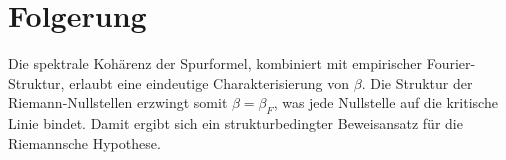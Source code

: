 \documentclass[12pt]{article}
\begin{document}
\section*{Folgerung}

Die spektrale Kohärenz der Spurformel, kombiniert mit empirischer Fourier-Struktur, erlaubt eine eindeutige Charakterisierung von \(\beta\). Die Struktur der Riemann-Nullstellen erzwingt somit \(\beta = \beta_F\), was jede Nullstelle auf die kritische Linie bindet. Damit ergibt sich ein strukturbedingter Beweisansatz für die Riemannsche Hypothese.

\vspace{1cm}
\end{document}
